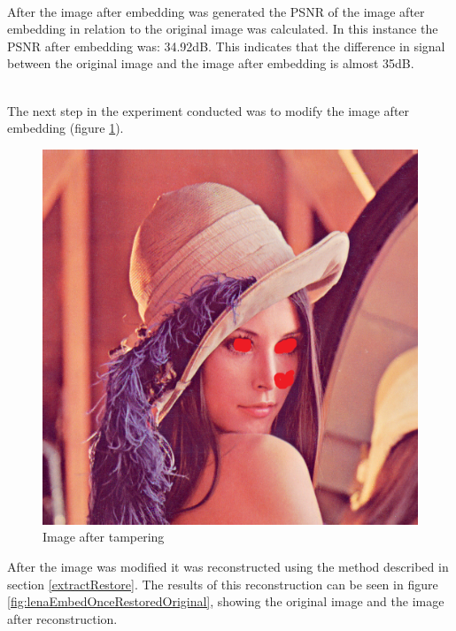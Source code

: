 \documentclass[12pt]{article}
\begin{document}
\hspace{0pt} \\
After the image after embedding was generated the PSNR of the image after embedding in relation to the original image was calculated.
In this instance the PSNR after embedding was: 34.92dB.
This indicates that the difference in signal between the original image and the image after embedding is almost 35dB.

\hspace{0pt} \\
The next step in the experiment conducted was to modify the image after embedding (figure \ref{fig:lenaEmbedOnceTampered}).
\begin{figure}[h]
	\centerline{%
	\includegraphics[scale=0.45]{"Lena Embed once 0.7 threshold/finalImage - Copy"}%
	}%
	\caption{Image after tampering}
	\label{fig:lenaEmbedOnceTampered}
\end{figure}
After the image was modified it was reconstructed using the method described in section \ref{extractRestore}.
The results of this reconstruction can be seen in figure \ref{fig:lenaEmbedOnceRestoredOriginal}, showing the original image and the image after reconstruction.
\end{document}
